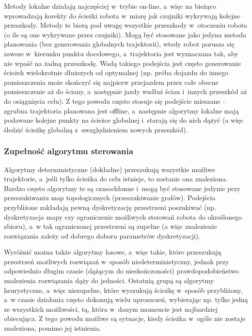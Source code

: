 Metody lokalne działają najczęściej w~trybie on-line, a~więc na bieżąco wprowadzają korekty
do ścieżki robota w~miarę jak czujniki wykrywają kolejne przeszkody. Metody te biorą
pod uwagę wszystkie przeszkody w~otoczeniu robota (o ile są one wykrywane przez czujniki).
Mogą być stosowane jako jedyna metoda planowania (bez generowania globalnych trajektorii),
wtedy robot porusza się zawsze w~kierunku punktu docelowego, a~trajektoria jest wyznaczana
tak, aby nie wpaść na żadną przeszkodę. Wadą takiego podejścia jest często generowanie
ścieżek wielokrotnie dłuższych od optymalnej (np. próba dojazdu do innego pomieszczenia
może skończyć się najpierw przejazdem przez całe obecne pomieszczenie aż do ściany, a~następnie
jazdy wzdłuż ścian i~innych przeszkód aż do osiągnięcia celu). Z tego powodu często
stosuje się podejście mieszane -- zgrubna trajektoria planowana jest offline, a~następnie
algorytmy lokalne mają podawane kolejne punkty na ścieżce globalnej i~starają się do nich
dążyć (a więc śledzić ścieżkę globalną z~uwzględnieniem nowych przeszkód).

\subsubsection{Zupełność algorytmu sterowania}

Algorytmy deterministyczne (dokładne) przeszukują wszystkie możliwe trajektorie,
a~jeśli tylko ścieżka do celu istnieje, to zostanie ona znaleziona. Bardzo często algorytmy
te są czasochłonne i~mogą być stosowane jedynie przy przeszukiwaniu map topologicznych
(przeszukiwanie grafów). Podejścia przybliżone zakładają pewną dyskretyzację przestrzeni
poszukiwać (np. dyskretyzacja mapy czy ograniczenie możliwych sterowań robota do określonego
zbioru), a~w tak ograniczonej przestrzeni są zupełne (a więc znalezienie rozwiązania
zależy od dobrego doboru parametrów dyskretyzacji).

Wyróżnić można także algorytmy losowe, a~więc takie, które przeszukują przestrzeń
możliwych rozwiązań w~sposób niedeterministyczny, jednak przy odpowiednio długim czasie
(dążącym do nieskończoności) prawdopodobieństwo znalezienia rozwiązania dąży do jedności.
Ostatnią grupą są algorytmy heurystyczne, a~więc niezupełne, które wyszukują ścieżkę
w~sposób przybliżony, a~w czasie działania często dokonują wielu uproszczeń, wybierając
np. tylko jedną ze wszystkich możliwości, tą, która w~danym momencie jest najbardziej
obiecująca. Z tego powodu możliwe są sytuacje, kiedy ścieżka w~ogóle nie zostaje
znaleziona, pomimo jej istnienia.

